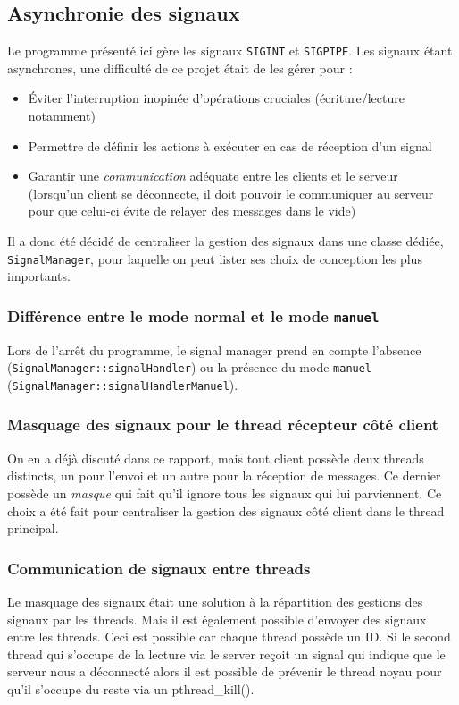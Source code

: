\documentclass{article}
\begin{document}
\subsection{Asynchronie des signaux}
Le programme présenté ici gère les signaux \texttt{SIGINT} et \texttt{SIGPIPE}. Les signaux étant asynchrones, une difficulté de ce projet était de les gérer pour :
\begin{itemize}
    \item Éviter l'interruption inopinée d'opérations cruciales (écriture/lecture notamment)
    \item Permettre de définir les actions à exécuter en cas de réception d'un signal
    \item Garantir une \textit{communication} adéquate entre les clients et le serveur (lorsqu'un client se déconnecte, il doit pouvoir le communiquer au serveur pour que celui-ci évite de relayer des messages dans le vide)
\end{itemize}

Il a donc été décidé de centraliser la gestion des signaux dans une classe dédiée, \texttt{SignalManager}, pour laquelle on peut lister ses choix de conception les plus importants.



\subsubsection{Différence entre le mode normal et le mode \texttt{manuel}}
Lors de l'arrêt du programme, le signal manager prend en compte l'absence (\texttt{SignalManager::signalHandler}) ou la présence du mode \texttt{manuel} (\texttt{SignalManager::signalHandlerManuel}).

\subsubsection*{Masquage des signaux pour le thread récepteur côté client}
 On en a déjà discuté dans ce rapport, mais tout client possède deux threads distincts, un pour l'envoi et un autre pour la réception de messages. Ce dernier possède un \textit{masque} qui fait qu'il ignore tous les signaux qui lui parviennent. Ce choix a été fait pour centraliser la gestion des signaux côté client dans le thread principal.

\subsubsection*{Communication de signaux entre threads}
Le masquage des signaux était une solution à la répartition des gestions des signaux par les threads. Mais il est également possible d'envoyer des signaux entre les threads. Ceci est possible car chaque thread possède un ID. Si le second thread qui s'occupe de la lecture via le server reçoit un signal qui indique que le serveur nous a déconnecté alors il est possible de prévenir le thread noyau pour qu'il s'occupe du reste via un pthread\_kill().
\end{document}

